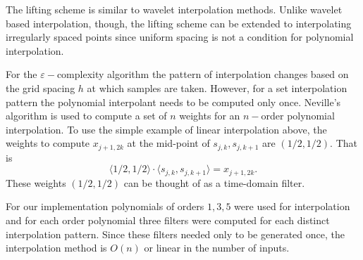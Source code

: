 The lifting scheme is similar to wavelet interpolation methods. Unlike wavelet based interpolation, though, the lifting scheme can be extended to interpolating
irregularly spaced points since uniform spacing is not a condition for polynomial interpolation. 

For the $\varepsilon-$complexity algorithm the pattern of interpolation changes based on the grid spacing $h$ at which samples are taken. 
However, for a set interpolation pattern the  
polynomial interpolant needs to be computed 
only once. Neville's algorithm is used 
to compute a set of $n$ weights for an 
$n-$order polynomial interpolation. To use the 
simple example of linear interpolation above, 
the weights to compute $x_{j+1, 2k}$ at the 
mid-point of $s_{j, k}, s_{j, k+1}$ are 
$(1/2, 1/2)$. That is 
\[
   \langle 1/2 , 1/2 \rangle \cdot 
   \langle s_{j, k}, s_{j, k+1} \rangle = x_{j+1, 2k}.  
\]
These weights $(1/2, 1/2)$ can be thought of 
as a time-domain filter. 

For our implementation 
polynomials of orders ${1,3,5}$ were used for interpolation and for each order polynomial three filters were computed for each distinct
interpolation pattern. Since these filters needed only to be generated once, the interpolation
method is $O(n)$ or linear in the number of inputs. 




